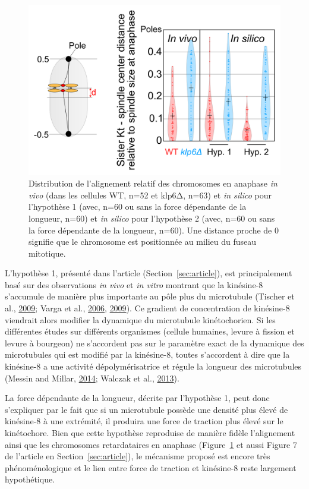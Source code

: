 \documentclass[12pt,a4paper,twoside,openright]{book}
\begin{document}
\begin{figure}[htbp]
\centering
\includegraphics{figures/results/modelling/ch_alignment.png}
\caption[Distribution de l'alignement relatif des chromosomes en anaphase]{\label{fig:ch_alignment}Distribution
de l'alignement relatif des chromosomes en anaphase \emph{in vivo} (dans
les cellules WT, n=52 et klp6Δ, n=63) et \emph{in silico} pour
l'hypothèse 1 (avec, n=60 ou sans la force dépendante de la longueur,
n=60) et \emph{in silico} pour l'hypothèse 2 (avec, n=60 ou sans la
force dépendante de la longueur, n=60). Une distance proche de 0
signifie que le chromosome est positionnée au milieu du fuseau
mitotique.}
\end{figure}

L'hypothèse 1, présenté dans l'article (Section~\ref{sec:article}), est
principalement basé sur des observations \emph{in vivo} et \emph{in
vitro} montrant que la kinésine-8 s'accumule de manière plus importante
au pôle plus du microtubule (Tischer et al.,
\hyperref[ref-Tischer2009]{2009}; Varga et al.,
\hyperref[ref-Varga2006]{2006}, \hyperref[ref-Varga2009]{2009}). Ce
gradient de concentration de kinésine-8 viendrait alors modifier la
dynamique du microtubule kinétochorien. Si les différentes études sur
différents organismes (cellule humaines, levure à fission et levure à
bourgeon) ne s'accordent pas sur le paramètre exact de la dynamique des
microtubules qui est modifié par la kinésine-8, toutes s'accordent à
dire que la kinésine-8 a une activité dépolymérisatrice et régule la
longueur des microtubules (Messin and Millar,
\hyperref[ref-Messin2014]{2014}; Walczak et al.,
\hyperref[ref-Walczak2013a]{2013}).

La force dépendante de la longueur, décrite par l'hypothèse 1, peut donc
s'expliquer par le fait que si un microtubule possède une densité plus
élevé de kinésine-8 à une extrémité, il produira une force de traction
plus élevé sur le kinétochore. Bien que cette hypothèse reproduise de
manière fidèle l'alignement ainsi que les chromosomes retardataires en
anaphase (Figure~\ref{fig:ch_alignment} et aussi Figure 7 de l'article
en Section~\ref{sec:article}), le mécanisme proposé est encore très
phénoménologique et le lien entre force de traction et kinésine-8 reste
largement hypothétique.
\end{document}
